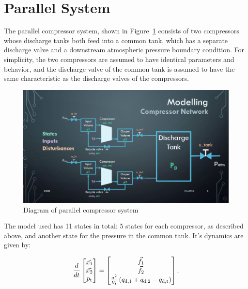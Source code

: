 \section{Parallel System}
\label{sec:mod:parallel}

The parallel compressor system, shown in Figure~\ref{fig:mod:parallel} consists of two compressors whose discharge tanks both feed into a common tank, which has a separate discharge valve and a downstream atmospheric pressure boundary condition.
For simplicity, the two compressors are assumed to have identical parameters and behavior, and the discharge valve of the common tank is assumed to have the same characteristic as the discharge valves of the compressors.

\begin{figure}[]
  \centering
  \includegraphics[width=\linewidth]{modelling/parallel_diagram.png}
  \caption{Diagram of parallel compressor system}
  \label{fig:mod:parallel}
\end{figure}


The model used has 11 states in total: 5 states for each compressor, as described above, and another state for the pressure in the common tank. It's dynamics are given by:

\begin{equation}
  \frac{d}{dt}\begin{bmatrix}
    \vec{x_1}\\
    \vec{x_2}\\
    p_\text{t}
  \end{bmatrix}
  =
  \begin{bmatrix}
    \vec{f_1}\\
    \vec{f_2}\\
    \frac{a^2}{V_\text{t}}\left(q_{\text{d,1}}+q_{\text{d,2}}-q_{\text{d,t}}\right)
  \end{bmatrix},
\end{equation}


